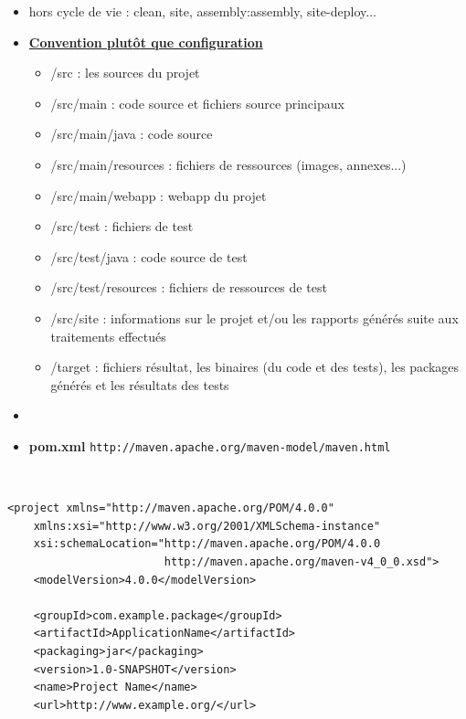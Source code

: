 \documentclass[11pt,twoside,a4paper]{article}
\begin{document}
\begin{landscape}
\begin{multicols}{2}
\begin{itemize}
		\item hors cycle de vie : \textsf{clean}, \textsf{site}, \textsf{assembly:assembly}, \textsf{site-deploy}...
		\item \underline{\textbf{Convention plut{\^o}t que configuration}}
		\begin{itemize}
			\item \textsf{/src} : les sources du projet
			\item \textsf{/src/main} : code source et fichiers source principaux
			\item \textsf{/src/main/java} : code source
			\item \textsf{/src/main/resources} : fichiers de ressources (images, annexes...)
			\item \textsf{/src/main/webapp} : webapp du projet
			\item \textsf{/src/test} : fichiers de test
			\item \textsf{/src/test/java} : code source de test
			\item \textsf{/src/test/resources} : fichiers de ressources de test
			\item \textsf{/src/site} : informations sur le projet et/ou les rapports g{\'e}n{\'e}r{\'e}s suite aux traitements effectu{\'e}s
			\item \textsf{/target} : fichiers r{\'e}sultat, les binaires (du code et des tests), les packages g{\'e}n{\'e}r{\'e}s et les r{\'e}sultats des tests
		\end{itemize}
		\item[]
		\item \textbf{pom.xml} \texttt{http://maven.apache.org/maven-model/maven.html}
	\end{itemize}
	
	~\\
	
	\columnbreak
	
	\footnotesize
	\begin{verbatim}
<project xmlns="http://maven.apache.org/POM/4.0.0"
    xmlns:xsi="http://www.w3.org/2001/XMLSchema-instance"
    xsi:schemaLocation="http://maven.apache.org/POM/4.0.0
                        http://maven.apache.org/maven-v4_0_0.xsd">
    <modelVersion>4.0.0</modelVersion>
    
    <groupId>com.example.package</groupId>
    <artifactId>ApplicationName</artifactId>
    <packaging>jar</packaging>
    <version>1.0-SNAPSHOT</version>
    <name>Project Name</name>
    <url>http://www.example.org/</url>
    

\end{verbatim}
\end{multicols}
\end{landscape}
\end{document}
